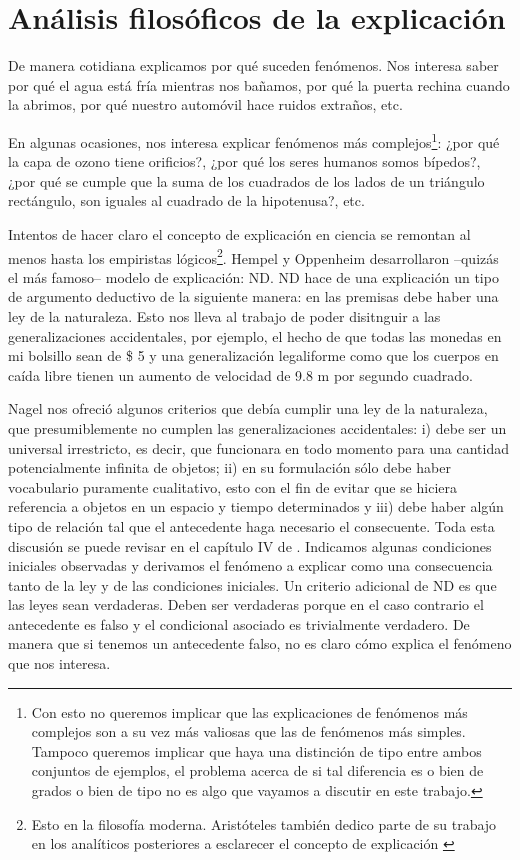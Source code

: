 \chapter{Análisis filosóficos de la explicación}

\noindent De manera cotidiana explicamos por qué suceden fenómenos. Nos interesa saber por qué el agua está fría mientras nos bañamos, por qué la puerta rechina cuando la abrimos, por qué nuestro automóvil hace ruidos extraños, etc.

En algunas ocasiones, nos interesa explicar fenómenos más complejos\footnote{Con esto no queremos implicar que las explicaciones de fenómenos más complejos son a su vez más valiosas que las de fenómenos más simples. Tampoco queremos implicar que haya una distinción de tipo entre ambos conjuntos de ejemplos, el problema acerca de si tal diferencia es o bien de grados o bien de tipo no es algo que vayamos a discutir en este trabajo.}: ¿por qué la capa de ozono tiene orificios?, ¿por qué los seres humanos somos bípedos?, ¿por qué se cumple que la suma de los cuadrados de los lados de un triángulo rectángulo, son iguales al cuadrado de la hipotenusa?, etc.

Intentos de hacer claro el concepto de explicación en ciencia se remontan al menos hasta los empiristas lógicos\footnote{Esto en la filosofía moderna. Aristóteles también dedico parte de su trabajo en los analíticos posteriores a esclarecer el concepto de explicación \cite{Aristoteles2009}}. Hempel y Oppenheim desarrollaron --quizás el más famoso-- modelo de explicación: ND. ND hace de una explicación un tipo de argumento deductivo de la siguiente manera: en las premisas debe haber una ley de la naturaleza. Esto nos lleva al trabajo de poder disitnguir a las generalizaciones accidentales, por ejemplo, el hecho de que todas las monedas en mi bolsillo sean de \$ 5 y una generalización legaliforme como que los cuerpos en caída libre tienen un aumento de velocidad de 9.8 m por segundo cuadrado.

Nagel nos ofreció algunos criterios que debía cumplir una ley de la naturaleza, que presumiblemente no cumplen las generalizaciones accidentales: i) debe ser un universal irrestricto, es decir, que funcionara en todo momento para una cantidad potencialmente infinita de objetos; ii) en su formulación sólo debe haber vocabulario puramente cualitativo, esto con el fin de evitar que se hiciera referencia a objetos en un espacio y tiempo determinados y iii) debe haber algún tipo de relación tal que el antecedente haga necesario el consecuente. Toda esta discusión se puede revisar en el capítulo IV de \cite{Nagel2006}. Indicamos algunas condiciones iniciales observadas y derivamos el fenómeno a explicar como una consecuencia tanto de la ley y de las condiciones iniciales. Un criterio adicional de ND es que las leyes sean verdaderas. Deben ser verdaderas porque en el caso contrario el antecedente es falso y el condicional asociado es trivialmente verdadero. De manera que si tenemos un antecedente falso, no es claro cómo explica el fenómeno que nos interesa.

